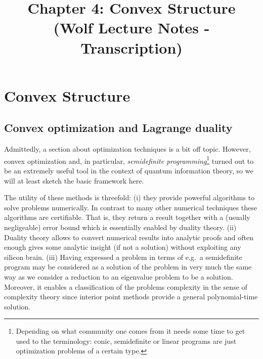 \documentclass[11pt,a4paper]{article}
\title{Chapter 4: Convex Structure \\ {\small (Wolf Lecture Notes - Transcription)}}
\date{}
\numberwithin{equation}{section}
\begin{document}
\maketitle
\tableofcontents

\setcounter{section}{3}

\section{Convex Structure}

\subsection{Convex optimization and Lagrange duality}

Admittedly, a section about optimization techniques is a bit off topic. However,
convex optimization and, in particular, \emph{semidefinite programming}\footnote{Depending on what community one comes from it needs some time to get used to the terminology: conic, semidefinite or linear programs are just optimization problems of a certain type.}
turned out to be an extremely useful tool in the context of quantum information
theory, so we will at least sketch the basic framework here.

The utility of these methods is threefold: (i) they provide powerful algorithms
to solve problems numerically. In contrast to many other numerical techniques
these algorithms are certifiable. That is, they return a result together with a
(usually negligeable) error bound which is essentially enabled by duality theory.
(ii) Duality theory allows to convert numerical results into analytic proofs and
often enough gives some analytic insight (if not a solution) without exploiting
any silicon brain. (iii) Having expressed a problem in terms of e.g.\ a
semidefinite program may be considered as a solution of the problem in very
much the same way as we consider a reduction to an eigenvalue problem to be a
solution. Moreover, it enables a classification of the problems complexity in
the sense of complexity theory since interior point methods provide a general
polynomial-time solution.
\end{document}
